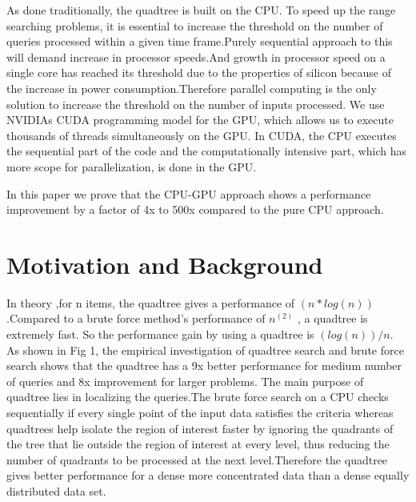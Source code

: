 \documentclass{article}
\begin{document}
As done traditionally, the quadtree is built on the CPU. To speed up the range searching problems, it is essential to increase the threshold on the number of queries processed within a given time frame.Purely sequential approach to this will demand increase in processor speeds.And growth in processor speed on a single core has reached its threshold due to the properties of silicon because of  the increase in power consumption.Therefore parallel computing is the only solution to increase the threshold on the number of inputs processed. 
We use NVIDIAs CUDA programming model for the GPU, which allows us to execute thousands of threads simultaneously on the GPU. In CUDA, the CPU executes the sequential part of the code and the computationally intensive part, which has more scope for parallelization, is done in the GPU. 

In this paper we prove that the CPU-GPU approach shows a performance improvement by a factor of 4x to 500x compared to the pure CPU approach.





\section{Motivation and Background}

In theory ,for n items, the quadtree gives a  performance of ${(n*log(n))}$ .Compared to a brute force method's performance of $n^{(2)}$ , a quadtree is extremely fast. So the performance gain by using a quadtree is ${(log(n))/n}$.  
As shown in Fig 1, the empirical investigation of quadtree search and brute force search shows that the quadtree has a 9x better performance for medium number of queries and 8x improvement for larger problems.
The main purpose of quadtree lies in localizing the queries.The brute force search on a CPU checks sequentially if every single point of the input data satisfies the criteria whereas quadtrees help isolate the region of interest faster by ignoring the quadrants of the tree that lie outside the region of interest at every level, thus reducing the number of quadrants to be processed at the next level.Therefore the quadtree gives better performance for a dense more concentrated data than a dense equally distributed data set.
\end{document}

